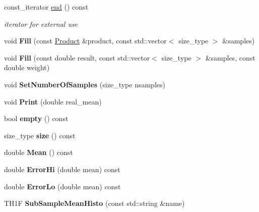 \begin{DoxyCompactItemize}
\mbox{\label{classQn_1_1SubSamples_a4d806b9cf180dd44738d9e4aa05c2000}} 
const\+\_\+iterator \mbox{\hyperlink{classQn_1_1SubSamples_a4d806b9cf180dd44738d9e4aa05c2000}{end}} () const
\begin{DoxyCompactList}\small\item\em iterator for external use \end{DoxyCompactList}\item 
\mbox{\label{classQn_1_1SubSamples_ae1b324603377466b0f06a030dcc19af5}} 
void {\bfseries Fill} (const \mbox{\hyperlink{structQn_1_1Product}{Product}} \&product, const std\+::vector$<$ size\+\_\+type $>$ \&samples)
\item 
\mbox{\label{classQn_1_1SubSamples_aecae87b2ee291b624be9bc057b4c2b5d}} 
void {\bfseries Fill} (const double result, const std\+::vector$<$ size\+\_\+type $>$ \&samples, const double weight)
\item 
\mbox{\label{classQn_1_1SubSamples_a90853990f8d491ef8fee689eeb5e7bc6}} 
void {\bfseries Set\+Number\+Of\+Samples} (size\+\_\+type nsamples)
\item 
\mbox{\label{classQn_1_1SubSamples_a32170cae9a77e739b65c3c019d6291ad}} 
void {\bfseries Print} (double real\+\_\+mean)
\item 
\mbox{\label{classQn_1_1SubSamples_ad25ec7b31a7e7d7aa1fcb7ef655a86e6}} 
bool {\bfseries empty} () const
\item 
\mbox{\label{classQn_1_1SubSamples_aa96d38a4f4f16a847dc4bffefe0f771e}} 
size\+\_\+type {\bfseries size} () const
\item 
\mbox{\label{classQn_1_1SubSamples_a0f934f285b52ba54429496f2cfc3ec5a}} 
double {\bfseries Mean} () const
\item 
\mbox{\label{classQn_1_1SubSamples_a723b3da67973c21bae32bc1d47d9d381}} 
double {\bfseries Error\+Hi} (double mean) const
\item 
\mbox{\label{classQn_1_1SubSamples_a25da27a78ea840f76c4539c37adece6a}} 
double {\bfseries Error\+Lo} (double mean) const
\item 
\mbox{\label{classQn_1_1SubSamples_a33bdd8ba02a014c96754d3d7b29f3026}} 
T\+H1F {\bfseries Sub\+Sample\+Mean\+Histo} (const std\+::string \&name)
\end{DoxyCompactItemize}
